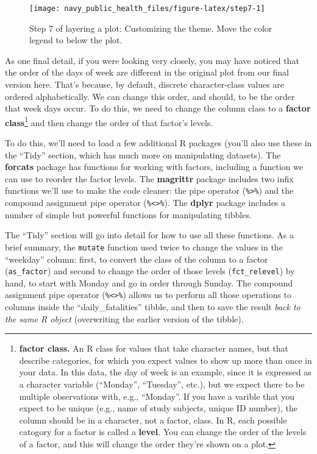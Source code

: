 \documentclass[]{tufte-book}
\begin{document}
\begin{figure*}
\texttt{[image: navy\_public\_health\_files/figure-latex/step7-1]} \caption[Step 7 of layering a plot]{Step 7 of layering a plot: Customizing the theme. Move the color legend to below the plot.}\label{fig:step7}
\end{figure*}

As one final detail, if you were looking very closely, you may have noticed that
the order of the days of week are different in the original plot from our final
version here. That's because, by default, discrete character-class values are
ordered alphabetically. We can change this order, and should, to be the order that
week days occur. To do this, we need to change the column class to a
\textbf{factor class}\footnote{\textbf{factor class.} An R class for values that take character names,
  but that describe categories, for which you expect values to show up more than once
  in your data. In this data, the day of week is an example, since it is expressed
  as a character variable (``Monday'', ``Tuesday'', etc.), but we expect there to be
  multiple observations with, e.g., ``Monday''. If you have a varible that you expect
  to be unique (e.g., name of study subjects, unique ID number), the column should
  be in a character, not a factor, class.
  In R, each possible catogory for a factor is called a \textbf{level}.
  You can change the order of the levels of a factor, and this will change the
  order they're shown on a plot.} and then change the order of that factor's levels.

To do this, we'll need to load a few additional R packages (you'll also use these
in the ``Tidy'' section, which has much more on manipulating datasets). The
\textbf{forcats} package \citep{R-forcats} has functions for working with factors, including
a function we can use to reorder the factor levels. The \textbf{magrittr} package
\citep{R-magrittr} includes two infix functions we'll use to make the code
cleaner: the pipe operator (\texttt{\%\textgreater{}\%}) and the compound assignment pipe operator (\texttt{\%\textless{}\textgreater{}\%}).
The \textbf{dplyr} package \citep{R-dplyr} includes a number of simple but powerful functions
for manipulating tibbles.

The ``Tidy'' section will go into detail for how to use all these functions. As a brief
summary, the \texttt{mutate} function used twice to change the values in the ``weekday'' column:
first, to convert the class of the column to a factor (\texttt{as\_factor}) and second to
change the order of those levels (\texttt{fct\_relevel}) by hand, to start with Monday and
go in order through Sunday. The compound assignment pipe operator (\texttt{\%\textless{}\textgreater{}\%}) allows
us to perform all those operations to columns inside the ``daily\_fatalities'' tibble,
and then to save the result \emph{back to the same R object} (overwriting the earlier
version of the tibble).
\end{document}

